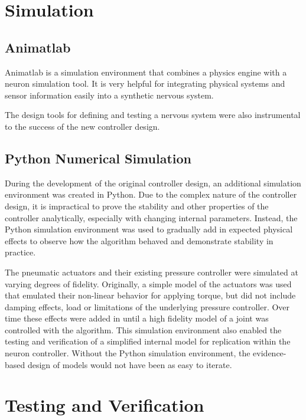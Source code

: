 \section{Simulation}

\subsection{Animatlab}

Animatlab is a simulation environment that combines a physics engine with a
neuron simulation tool. It is very helpful for integrating physical systems
and sensor information easily into a synthetic nervous system.

The design tools for defining and testing a nervous system were also instrumental
to the success of the new controller design.

\subsection{Python Numerical Simulation}

During the development of the original controller design, an additional
simulation environment was created in Python. Due to the complex nature of
the controller design, it is impractical to prove the stability and other
properties of the controller analytically, especially with changing internal
parameters. Instead, the Python simulation environment was used to gradually add
in expected physical effects to observe how the algorithm behaved and demonstrate
stability in practice.

The pneumatic actuators and their existing pressure controller were simulated 
at varying degrees of fidelity. Originally, a simple model of the actuators
was used that emulated their non-linear behavior for applying torque, but did not
include damping effects, load or limitations of the underlying pressure
controller. Over time these effects were added in until a high fidelity model of
a joint was controlled with the algorithm. This simulation environment also
enabled the testing and verification of a simplified internal model for
replication within the neuron controller. Without the Python simulation
environment, the evidence-based design of models would not have been as easy to
iterate.

\section{Testing and Verification}


